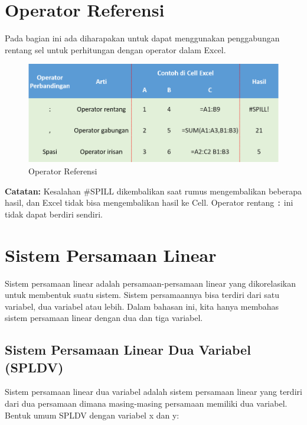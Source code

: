 \documentclass[
]{book}
\begin{document}
\hypertarget{operator-referensi}{%
\section{Operator Referensi}\label{operator-referensi}}

Pada bagian ini ada diharapakan untuk dapat menggunakan penggabungan rentang sel untuk perhitungan dengan operator dalam Excel.

\begin{figure}

{\centering \includegraphics[width=0.75\linewidth]{images/referensi} 

}

\caption{Operator Referensi}\label{fig:referensi}
\end{figure}

\textbf{Catatan:} Kesalahan \#SPILL dikembalikan saat rumus mengembalikan beberapa hasil, dan Excel tidak bisa mengembalikan hasil ke Cell. Operator rentang \texttt{:} ini tidak dapat berdiri sendiri.

\hypertarget{sistem-persamaan-linear}{%
\section{Sistem Persamaan Linear}\label{sistem-persamaan-linear}}

Sistem persamaan linear adalah persamaan-persamaan linear yang dikorelasikan untuk membentuk suatu sistem. Sistem persamaannya bisa terdiri dari satu variabel, dua variabel atau lebih. Dalam bahasan ini, kita hanya membahas sistem persamaan linear dengan dua dan tiga variabel.

\hypertarget{sistem-persamaan-linear-dua-variabel-spldv}{%
\subsection{Sistem Persamaan Linear Dua Variabel (SPLDV)}\label{sistem-persamaan-linear-dua-variabel-spldv}}

Sistem persamaan linear dua variabel adalah sistem persamaan linear yang terdiri dari dua persamaan dimana masing-masing persamaan memiliki dua variabel. Bentuk umum SPLDV dengan variabel x dan y:
\end{document}
